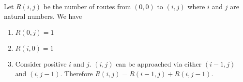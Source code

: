 \documentclass[12pt]{article}
\begin{document}
Let $R(i,j)$ be the number of routes from $(0,0)$ to $(i,j)$ where $i$ and $j$ are natural numbers. We have
\begin{enumerate}
    \item $R(0,j) = 1$
    \item $R(i,0) = 1$
    \item Consider positive $i$ and $j$. $(i,j)$ can be approached via either $(i-1,j)$ and $(i,j-1)$. Therefore $R(i,j)=R(i-1,j)+R(i,j-1)$.
\end{enumerate}
\end{document}
